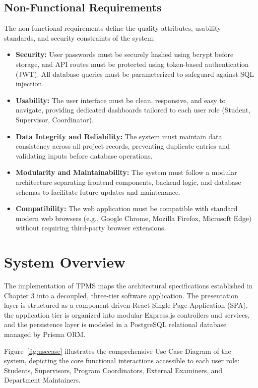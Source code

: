 \subsection{Non-Functional Requirements}
The non-functional requirements define the quality attributes, usability standards, and security constraints of the system:

\begin{itemize}
  \item \textbf{Security:} User passwords must be securely hashed using bcrypt before storage, and API routes must be protected using token-based authentication (JWT). All database queries must be parameterized to safeguard against SQL injection.
  
  \item \textbf{Usability:} The user interface must be clean, responsive, and easy to navigate, providing dedicated dashboards tailored to each user role (Student, Supervisor, Coordinator).
  
  \item \textbf{Data Integrity and Reliability:} The system must maintain data consistency across all project records, preventing duplicate entries and validating inputs before database operations.
  
  \item \textbf{Modularity and Maintainability:} The system must follow a modular architecture separating frontend components, backend logic, and database schemas to facilitate future updates and maintenance.
  
  \item \textbf{Compatibility:} The web application must be compatible with standard modern web browsers (e.g., Google Chrome, Mozilla Firefox, Microsoft Edge) without requiring third-party browser extensions.
\end{itemize}

\section{System Overview}
The implementation of TPMS maps the architectural specifications established in Chapter 3 into a decoupled, three-tier software application. The presentation layer is structured as a component-driven React Single-Page Application (SPA), the application tier is organized into modular Express.js controllers and services, and the persistence layer is modeled in a PostgreSQL relational database managed by Prisma ORM.

Figure~\ref{fig:usecase} illustrates the comprehensive Use Case Diagram of the system, depicting the core functional interactions accessible to each user role: Students, Supervisors, Program Coordinators, External Examiners, and Department Maintainers.

